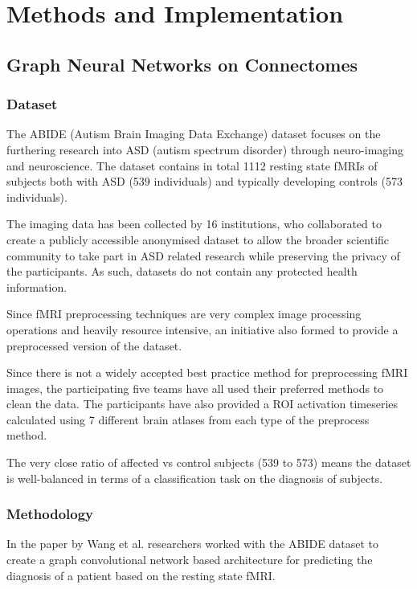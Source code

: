 \chapter{Methods and Implementation}

\section{Graph Neural Networks on Connectomes}

	\subsection{Dataset}
	
	The ABIDE (Autism Brain Imaging Data Exchange) dataset focuses on the furthering research into ASD (autism spectrum disorder) through neuro-imaging and neuroscience. The dataset contains in total 1112 resting state fMRIs of subjects both with ASD (539 individuals) and typically developing controls (573 individuals). 
	
	The imaging data has been collected by 16 institutions, who collaborated to create a publicly accessible anonymised dataset to allow the broader scientific community to take part in ASD related research while preserving the privacy of the participants. As such, datasets do not contain any protected health information. 
	
	Since fMRI preprocessing techniques are very complex image processing operations and heavily resource intensive, an initiative also formed to provide a preprocessed version of the dataset. 
	
	Since there is not a widely accepted best practice method for preprocessing fMRI images, the participating five teams have all used their preferred methods to clean the data. The participants have also provided a ROI activation timeseries calculated using 7 different brain atlases from each type of the preprocess method. 
	
	The very close ratio of affected vs control subjects (539 to 573) means the dataset is well-balanced in terms of a classification task on the diagnosis of subjects. 
	
	\subsection{Methodology}
	In the paper \cite{wang2021graph} by Wang et al. researchers worked with the ABIDE dataset to create a graph convolutional network based architecture for predicting the diagnosis of a patient based on the resting state fMRI. 
	
